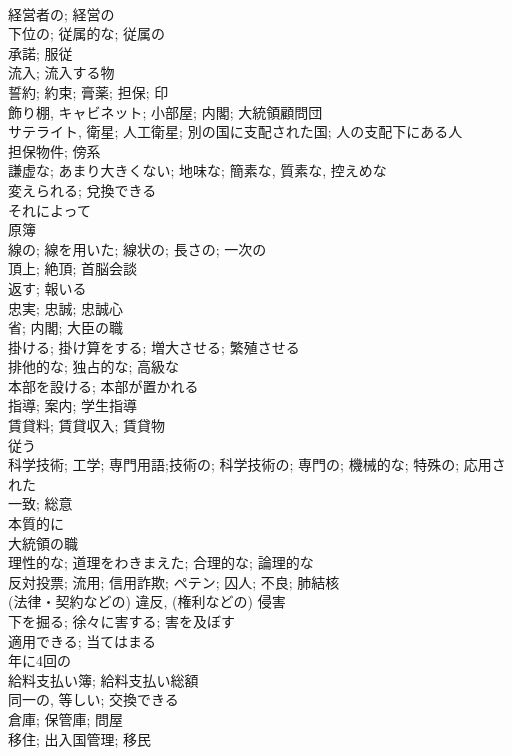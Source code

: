 \documentclass[8pt]{extreport}
\begin{document}
\begin{CJK}{UTF8}{min}
\\	経営者の; 経営の
\\	下位の; 従属的な; 従属の	
\\	承諾; 服従	
\\	流入; 流入する物	
\\	誓約; 約束; 膏薬; 担保; 印	
\\	飾り棚, キャビネット; 小部屋; 内閣; 大統領顧問団	
\\	サテライト, 衛星; 人工衛星; 別の国に支配された国; 人の支配下にある人	
\\	担保物件; 傍系	
\\	謙虚な; あまり大きくない; 地味な; 簡素な, 質素な, 控えめな	
\\	変えられる; 兌換できる	
\\	それによって	
\\	原簿	
\\	線の; 線を用いた; 線状の; 長さの; 一次の	
\\	頂上; 絶頂; 首脳会談	
\\	返す; 報いる	
\\	忠実; 忠誠; 忠誠心	
\\	省; 内閣; 大臣の職	
\\	掛ける; 掛け算をする; 増大させる; 繁殖させる	
\\	排他的な; 独占的な; 高級な	
\\	本部を設ける; 本部が置かれる	
\\	指導; 案内; 学生指導	
\\	賃貸料; 賃貸収入; 賃貸物	
\\	従う	
\\	科学技術; 工学; 専門用語;技術の; 科学技術の; 専門の; 機械的な; 特殊の; 応用された	
\\	一致; 総意	
\\	本質的に	
\\	大統領の職	
\\	理性的な; 道理をわきまえた; 合理的な; 論理的な	
\\	反対投票; 流用; 信用詐欺; ペテン; 囚人; 不良; 肺結核	
\\	(法律・契約などの) 違反, (権利などの) 侵害	
\\	下を掘る; 徐々に害する; 害を及ぼす	
\\	適用できる; 当てはまる	
\\	年に4回の	
\\	給料支払い簿; 給料支払い総額	
\\	同一の, 等しい; 交換できる	
\\	倉庫; 保管庫; 問屋	
\\	移住; 出入国管理; 移民	

\end{CJK}
\end{document}
